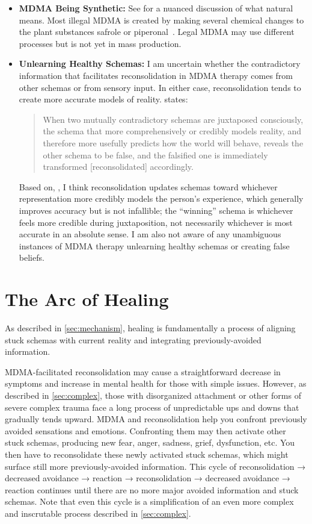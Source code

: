 \documentclass[11pt,oneside]{book}
\let\cite\parencite
\begin{document}
\begin{itemize}
    \item \textbf{MDMA Being Synthetic:}
        See \textcite{ruggeriNatural} for a nuanced discussion of what natural means. Most illegal MDMA is created by making several chemical changes to the plant substances safrole or piperonal~\cite{worldDrugReport,euMDMA}. Legal MDMA may use different processes but is not yet in mass production.
    \item \textbf{Unlearning Healthy Schemas:}
        I am uncertain whether the contradictory information that facilitates reconsolidation in MDMA therapy comes from other schemas or from sensory input. In either case, reconsolidation tends to create more accurate models of reality. \textcite[p. 28]{ecker2015misunderstood} states:
        \begin{quotation}
            When two mutually contradictory schemas are juxtaposed consciously, the schema that more comprehensively or credibly models reality, and therefore more usefully predicts how the world will behave, reveals the other schema to be false, and the falsified one is immediately transformed [reconsolidated] accordingly.
        \end{quotation}

        Based on, \textcite{eckerUnlocking}, I think reconsolidation updates schemas toward whichever representation more credibly models the person's experience, which generally improves accuracy but is not infallible; the \enquote{winning} schema is whichever feels more credible during juxtaposition, not necessarily whichever is most accurate in an absolute sense. I am also not aware of any unambiguous instances of MDMA therapy unlearning healthy schemas or creating false beliefs.
\end{itemize}

\chapter{The Arc of Healing}
\label{bigPicture}
As described in \cref{sec:mechanism}, healing is fundamentally a process of aligning stuck schemas with current reality and integrating previously-avoided information.

MDMA-facilitated reconsolidation may cause a straightforward decrease in symptoms and increase in mental health for those with simple issues. However, as described in \cref{sec:complex}, those with disorganized attachment or other forms of severe complex trauma face a long process of unpredictable ups and downs that gradually tends upward. MDMA and reconsolidation help you confront previously avoided sensations and emotions. Confronting them may then activate other stuck schemas, producing new fear, anger, sadness, grief, dysfunction, etc. You then have to reconsolidate these newly activated stuck schemas, which might surface still more previously-avoided information. This cycle of reconsolidation → decreased avoidance → reaction → reconsolidation → decreased avoidance → reaction continues until there are no more major avoided information and stuck schemas. Note that even this cycle is a simplification of an even more complex and inscrutable process described in \cref{sec:complex}.
\end{document}

